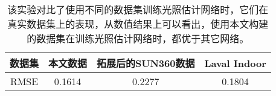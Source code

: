 \begin{table}[htbp]
    \centering
    \begin{tabular}{c|c|c|c}
        \toprule
    数据集& 本文数据  & 拓展后的SUN360数据 & Laval Indoor\\ \hline
    RMSE &  0.1614 & 0.2277 & 0.1804 \\
        \bottomrule
    \end{tabular}
    \caption[与现有数据集对比]{
        \label{table:eval-data-previous}
        该实验对比了使用不同的数据集训练光照估计网络时，它们在真实数据集上的表现，从数值结果上可以看出，使用本文构建的数据集在训练光照估计网络时，都优于其它网络。
    }
\end{table}